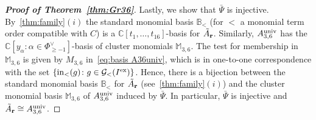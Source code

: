 \documentclass[10pt,a4paper]{amsart}
\newcommand{\thref}[1]{\ref{#1}}
\numberwithin{equation}{section}
\DeclareMathOperator{\init}{in}
\begin{document}
\begin{proof}[{\bf Proof of Theorem~\ref{thm:Gr36}}]
 \medskip

 Lastly, we show that $\bar \Psi$ is injective.
 By~\thref{thm:family}$(i)$ the standard monomial basis $\mathbb B_{<}$ (for $<$ a monomial term order compatible with $C$) is a $\mathbb C[t_1,\dots,t_{16}]$-basis for $\tilde A_{\bf r}$.
 Similarly, $A_{3,6}^{\rm univ}$ has the $\mathbb C[y_\alpha\colon \alpha\in \Phi^{\vee}_{\ge -1}]$-basis of cluster monomials $\mathbb M_{3,6}$.
 The test for membership in $\mathbb M_{3,6}$ is given by $M_{3,6}$ in~\eqref{eq:basis A36univ}, which is in one-to-one correspondence with the set $\{\init_<(g)\colon g\in \mathcal G_<(I^{\rm ex})\}$.
 Hence, there is a bijection between the standard monomial basis $\mathbb B_{<}$ for $\tilde A_{\bf r}$ (see~\thref{thm:family}$(i)$) and the cluster monomial basis $\mathbb M_{3,6}$ of $A_{3,6}^{\rm univ}$ induced by $\bar \Psi$.
 In particular, $\bar \Psi$ is injective and $\tilde A_{\bf r}\cong A_{3,6}^{\rm univ}$.


\end{proof}
\end{document}

